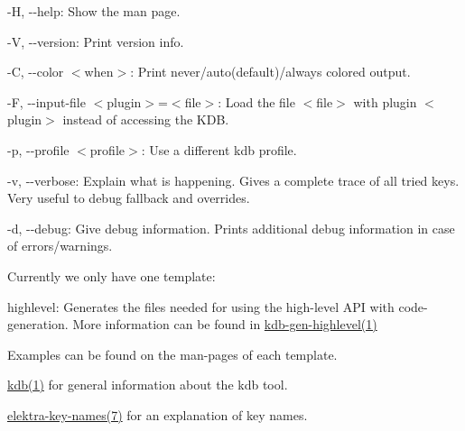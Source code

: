 \begin{DoxyItemize}
\item {\ttfamily -\/H}, {\ttfamily -\/-\/help}\+: Show the man page.
\item {\ttfamily -\/V}, {\ttfamily -\/-\/version}\+: Print version info.
\item {\ttfamily -\/C}, {\ttfamily -\/-\/color $<$when$>$}\+: Print never/auto(default)/always colored output.
\item {\ttfamily -\/F}, {\ttfamily -\/-\/input-\/file $<$plugin$>$=$<$file$>$}\+: Load the file {\ttfamily $<$file$>$} with plugin {\ttfamily $<$plugin$>$} instead of accessing the K\+DB.
\item {\ttfamily -\/p}, {\ttfamily -\/-\/profile $<$profile$>$}\+: Use a different kdb profile.
\item {\ttfamily -\/v}, {\ttfamily -\/-\/verbose}\+: Explain what is happening. Gives a complete trace of all tried keys. Very useful to debug fallback and overrides.
\item {\ttfamily -\/d}, {\ttfamily -\/-\/debug}\+: Give debug information. Prints additional debug information in case of errors/warnings.
\end{DoxyItemize}

Currently we only have one template\+:


\begin{DoxyItemize}
\item {\ttfamily highlevel}\+: Generates the files needed for using the high-\/level A\+PI with code-\/generation. More information can be found in \mbox{\hyperlink{doc_help_kdb-gen-highlevel_md}{kdb-\/gen-\/highlevel(1)}}
\end{DoxyItemize}

Examples can be found on the man-\/pages of each template.


\begin{DoxyItemize}
\item \mbox{\hyperlink{doc_help_kdb_md}{kdb(1)}} for general information about the {\ttfamily kdb} tool.
\item \mbox{\hyperlink{doc_help_elektra-key-names_md}{elektra-\/key-\/names(7)}} for an explanation of key names. 
\end{DoxyItemize}